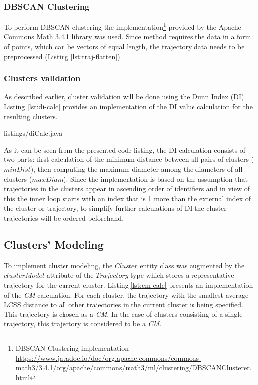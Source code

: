 \subsubsection{DBSCAN Clustering}

To perform DBSCAN clustering the implementation\footnote{DBSCAN Clustering implementation \url{https://www.javadoc.io/doc/org.apache.commons/commons-math3/3.4.1/org/apache/commons/math3/ml/clustering/DBSCANClusterer.html}} provided by the Apache Commons Math 3.4.1 library was used. Since method requires the data 
in a form of points, which can be vectors of equal length, the trajectory data needs to be preprocessed (Listing \ref{lst:traj-flatten}).



\subsubsection{Clusters validation}

As described earlier, cluster validation will be done using the Dunn Index (DI). Listing \ref{lst:di-calc} provides an implementation of the DI value calculation for the resulting clusters.

 {listings/diCalc.java}

As it can be seen from the presented code listing, the DI calculation consists of two parts: first calculation of the minimum distance between all pairs of clusters ($minDist$), then computing the maximum diameter among the diameters of all clusters ($maxDiam$). Since the implementation is based on the assumption that trajectories in the clusters appear in ascending order of identifiers and in view of this the inner loop starts with an index that is 1 more than the external index of the cluster or trajectory, to simplify further calculations of DI the cluster trajectories will be ordered beforehand.

\subsection{Clusters' Modeling}

To implement cluster modeling, the $Cluster$ entity class was augmented by the $clusterModel$ attribute of the $Trajectory$ type which stores a representative trajectory for the current cluster. Listing \ref{lst:cm-calc} presents an implementation of the \textit{CM} calculation. For each cluster, the trajectory with the smallest average LCSS distance to all other trajectories in the current cluster is being specified. This trajectory is chosen as a \textit{CM}. In the case of clusters consisting of a single trajectory, this trajectory is considered to be a \textit{CM}.

